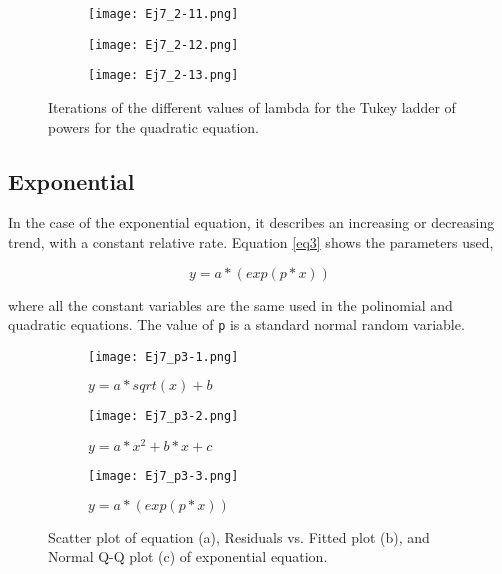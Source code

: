 \documentclass{article}
\begin{document}
\begin{figure}[]
\begin{subfigure}{.23\textwidth}
  \label{sb5-10}
\end{subfigure}
\begin{subfigure}{.23\textwidth}
  \centering
  \texttt{[image: Ej7\_2-11.png]}  
  \caption{ }
  \label{sb5-11}
\end{subfigure}
\begin{subfigure}{.23\textwidth}
  \centering
  \texttt{[image: Ej7\_2-12.png]}  
  \caption{ }
  \label{sb5-12}
\end{subfigure}
\newline
\begin{subfigure}{1\textwidth}
  \centering
  \texttt{[image: Ej7\_2-13.png]}  
  \caption{ }
  \label{sb5-13}
\end{subfigure}
\caption{Iterations of the different values of lambda for the Tukey ladder of powers for the quadratic equation.}
\label{fig5}
\end{figure}

\clearpage

\subsection{Exponential}

In the case of the exponential equation, it describes an increasing or decreasing trend, with a constant relative rate. Equation \ref{eq3} shows the parameters used, 

\begin{equation} \label{eq3}
y = a * (exp(p * x))
\end{equation}

where all the constant variables are the same used in the polinomial and quadratic equations. The value of \texttt{p} is a standard normal random variable.\\

\begin{figure}[]
\begin{subfigure}{.3\textwidth}
  \centering
  \texttt{[image: Ej7\_p3-1.png]}  
  \caption{$y = a * sqrt(x) + b$ }
  \label{sb6-1}
\end{subfigure}
\begin{subfigure}{.3\textwidth}
  \centering
  \texttt{[image: Ej7\_p3-2.png]}  
  \caption{$y = a*x^2 + b*x + c$}
  \label{sb6-2}
\end{subfigure}
\begin{subfigure}{.3\textwidth}
  \centering
  \texttt{[image: Ej7\_p3-3.png]}  
  \caption{$y = a * (exp(p * x))  $}
  \label{sb6-3}
\end{subfigure}
\caption{Scatter plot of equation (a), Residuals vs. Fitted plot (b), and Normal Q-Q plot (c) of exponential equation.}
\label{fig6}
\end{figure}
\end{document}
